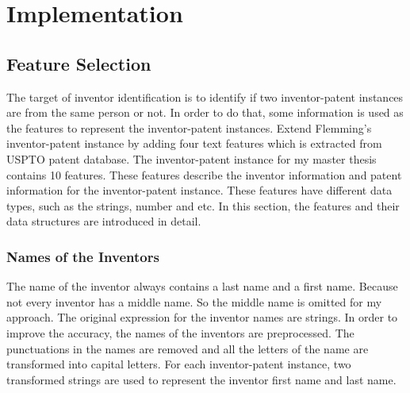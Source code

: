 \chapter{Implementation}
\label{cha:impl}

\section{Feature Selection}
The target of inventor identification is to identify if two inventor-patent instances are from the same person or not. In order to do that, some information is used as the features to represent the inventor-patent instances. Extend Flemming's\cite{RePEc:eee:respol:v:43:y:2014:i:6:p:941-955} inventor-patent instance by adding four text features which is extracted from USPTO patent database. The inventor-patent instance for my master thesis contains 10 features. These features describe the inventor information and patent information for the inventor-patent instance. These features have different data types, such as the strings, number and etc. In this section, the features and their data structures are introduced in detail.


\subsection{Names of the Inventors}
The name of the inventor always contains a last name and a first name. Because not every inventor has a middle name. So the middle name is omitted for my approach. The original expression for the inventor names are strings. In order to improve the accuracy, the names of the inventors are preprocessed. The punctuations in the names are removed and all the letters of the name are transformed into capital letters. For each inventor-patent instance, two transformed strings are used to represent the inventor first name and last name. 

